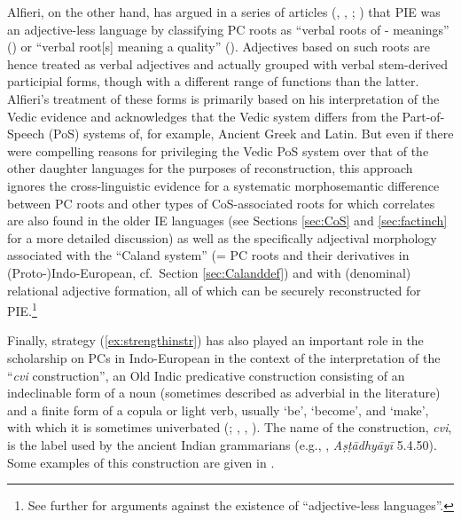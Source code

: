 \documentclass[output=paper,colorlinks,citecolor=brown]{langscibook}
\begin{document}
Alfieri, on the other hand, has argued in a series of articles (\citealt{Alfieri2016}, \citeyear{Alfieri2019}, \citeyear{Alfieri2021}; \citealt{AlfieriGasbarra}) that PIE was an adjective-less language by classifying PC roots as ``verbal roots of - meanings'' (\citealt[159]{Alfieri2016}) or ``verbal root[s] meaning a quality'' (\citeyear[314]{Alfieri2021}). Adjectives based on such roots are hence treated as verbal adjectives and actually grouped with verbal stem-derived  participial forms, though with a different range of functions than the latter. Alfieri's treatment of these forms is primarily based on his interpretation of the Vedic evidence and acknowledges that the Vedic system differs from the Part-of-Speech (PoS) systems of, for example, Ancient Greek and Latin. But even if there were compelling reasons for privileging the Vedic PoS system over that of the other daughter languages for the purposes of reconstruction, this approach ignores the  cross-linguistic evidence  for a systematic morphosemantic difference between PC roots and other types of CoS-associated roots for which correlates are also found in the older IE languages (see Sections \ref{sec:CoS} and \ref{sec:factinch} for a more detailed discussion) as well as the specifically adjectival morphology associated with the ``Caland system''  (= PC roots and their derivatives in (Proto-)Indo-European, cf.\ Section \ref{sec:Calanddef}) and with (denominal)  relational adjective formation, all of which can be securely reconstructed for PIE.\footnote{See further \citealt{AcedoMatellan2022} for arguments against the existence of ``adjective-less languages''.} 



Finally, strategy (\ref{ex:strengthinstr}) has also played an important role in the scholarship on PCs in Indo-European in the context of the interpretation of the ``\textit{cvi} construction'', an Old Indic predicative construction consisting of an indeclinable form of a noun (sometimes described as adverbial in the literature) and a finite form of a copula or light verb, usually  `be',  `become', and  `make', with which it is sometimes univerbated  (\citealt{Schindler1980}; \citealt{Balles2000}, \citeyear{Balles2006}, \citeyear{Balles2009}).  The name of the construction, \textit{cvi}, is the label used by the ancient Indian grammarians (e.g., , \textit{Aṣṭādhyāyī} 5.4.50). Some examples of this construction are given in .
\end{document}
